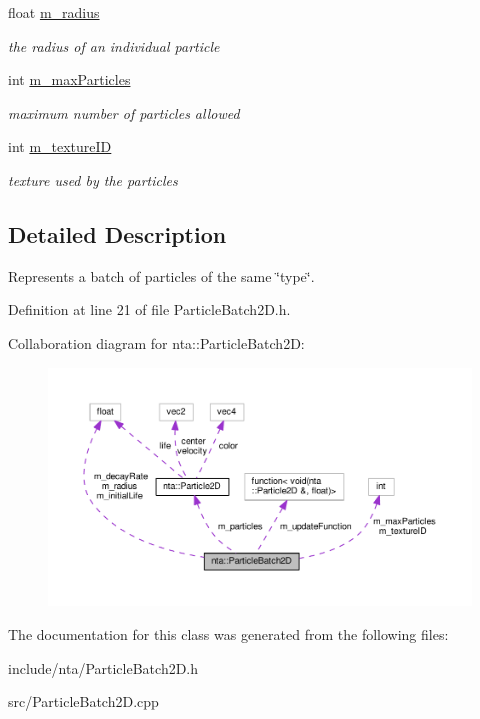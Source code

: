 \begin{DoxyCompactItemize}
float \hyperlink{classnta_1_1ParticleBatch2D_ac564b88da2f73d5692cbdec15478fe4d}{m\+\_\+radius}
\begin{DoxyCompactList}\small\item\em the radius of an individual particle \end{DoxyCompactList}\item 
\mbox{\label{classnta_1_1ParticleBatch2D_acf0dbc3bae31f962ed403daf06848948}} 
int \hyperlink{classnta_1_1ParticleBatch2D_acf0dbc3bae31f962ed403daf06848948}{m\+\_\+max\+Particles}
\begin{DoxyCompactList}\small\item\em maximum number of particles allowed \end{DoxyCompactList}\item 
\mbox{\label{classnta_1_1ParticleBatch2D_a73232a0481db52884b42c50deb456add}} 
int \hyperlink{classnta_1_1ParticleBatch2D_a73232a0481db52884b42c50deb456add}{m\+\_\+texture\+ID}
\begin{DoxyCompactList}\small\item\em texture used by the particles \end{DoxyCompactList}\end{DoxyCompactItemize}


\subsection{Detailed Description}
Represents a batch of particles of the same \char`\"{}type\char`\"{}. 

Definition at line 21 of file Particle\+Batch2\+D.\+h.



Collaboration diagram for nta\+:\+:Particle\+Batch2D\+:\nopagebreak
\begin{figure}[H]
\begin{center}
\leavevmode
\includegraphics[width=350pt]{d4/d22/classnta_1_1ParticleBatch2D__coll__graph}
\end{center}
\end{figure}


The documentation for this class was generated from the following files\+:\begin{DoxyCompactItemize}
\item 
include/nta/Particle\+Batch2\+D.\+h\item 
src/Particle\+Batch2\+D.\+cpp\end{DoxyCompactItemize}
